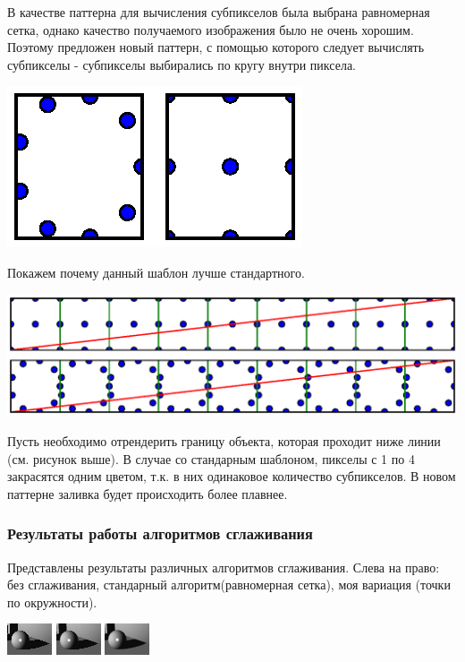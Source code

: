 \documentclass[12pt, a4paper]{article}
\begin{document}
В качестве паттерна для вычисления субпикселов была выбрана равномерная сетка, однако качество  получаемого изображения было не очень хорошим. Поэтому предложен новый паттерн, с помощью которого следует вычислять субпикселы - субпикселы выбирались по кругу внутри пиксела. 
\begin{center}
{\includegraphics[scale=1]{imgs/aa_pattern.eps}}
\end{center}
Покажем почему данный шаблон лучше стандартного.
\begin{center}
{\hspace*{-2.25cm}\includegraphics[scale=1]{imgs/aa_example.eps}}
\end{center}
Пусть необходимо отрендерить границу объекта, которая проходит ниже линии (см. рисунок выше). В случае со стандарным шаблоном, пикселы с 1 по 4 закрасятся одним цветом, т.к. в них одинаковое количество субпикселов. В новом паттерне заливка будет происходить более плавнее.
\subsubsection{Результаты работы алгоритмов сглаживания}
Представлены результаты различных алгоритмов сглаживания. Слева на право: без сглаживания, стандарный алгоритм(равномерная сетка), моя вариация (точки по окружности).
\begin{center}
\includegraphics[scale=4]{imgs/aa_no.png}
\includegraphics[scale=4]{imgs/aa_std.png}
\includegraphics[scale=4]{imgs/aa_my.png}
\end{center}
\end{document}
